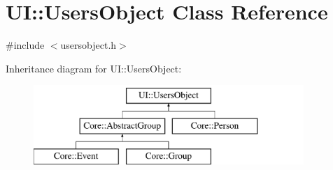 \hypertarget{classUI_1_1UsersObject}{
\section{UI::UsersObject Class Reference}
\label{df/d0b/classUI_1_1UsersObject}
}


{\ttfamily \#include $<$usersobject.h$>$}

Inheritance diagram for UI::UsersObject:\begin{figure}[H]
\begin{center}
\leavevmode
\includegraphics[height=3.000000cm]{df/d0b/classUI_1_1UsersObject}
\end{center}
\end{figure}
